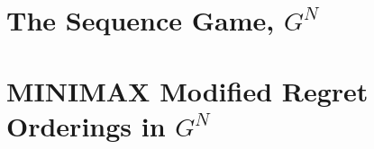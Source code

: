 \documentclass[11pt]{article}
\theoremstyle{boldStyle}
\begin{document}
\newpage
\section{The Sequence Game, $G^N$}





\newpage
\section{MINIMAX Modified Regret Orderings in $G^N$}
\end{document}
